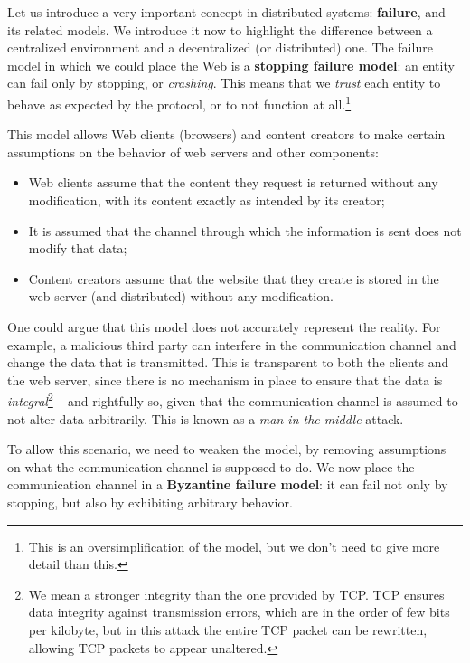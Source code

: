 \documentclass[mscthesis]{usiinfthesis}
\begin{document}
Let us introduce a very important concept in distributed systems: \textbf{failure}, and its related models.
We introduce it now to highlight the difference between a centralized environment and a decentralized (or distributed) one.
The failure model in which we could place the Web is a \textbf{stopping failure model}: an entity can fail only by stopping, or \textit{crashing}. This means that we \textit{trust} each entity to behave as expected by the protocol, or to not function at all.\footnote{This is an oversimplification of the model, but we don't need to give more detail than this.} %

This model allows Web clients (browsers) %
and content creators to make certain assumptions on the behavior of web servers and other components:
\begin{itemize}
	\item Web clients assume that the content they request is returned without any modification, with its content exactly as intended by its creator;
	\item It is assumed that the channel through which the information is sent does not modify that data;
	\item Content creators assume that the website that they create is stored in the web server (and distributed) without any modification.
\end{itemize}

One could argue that this model does not accurately represent the reality. For example, a malicious third party can interfere in the communication channel %
and change the data that is transmitted. This is transparent to both the clients and the web server, since there is no mechanism in place to ensure that the data is \textit{integral}\footnote{We mean a stronger integrity than the one provided by TCP. TCP ensures data integrity against transmission errors, which are in the order of few bits per kilobyte, but in this attack the entire TCP packet can be rewritten, allowing TCP packets to appear unaltered.} -- and rightfully so, given that the communication channel is assumed to not alter data arbitrarily. This is known as a \textit{man-in-the-middle} attack.

To allow this scenario, we need to weaken the model, by removing assumptions on what the communication channel is supposed to do. We now place the communication channel in a \textbf{Byzantine failure model}: it can fail not only by stopping, but also by exhibiting arbitrary behavior.
\end{document}
